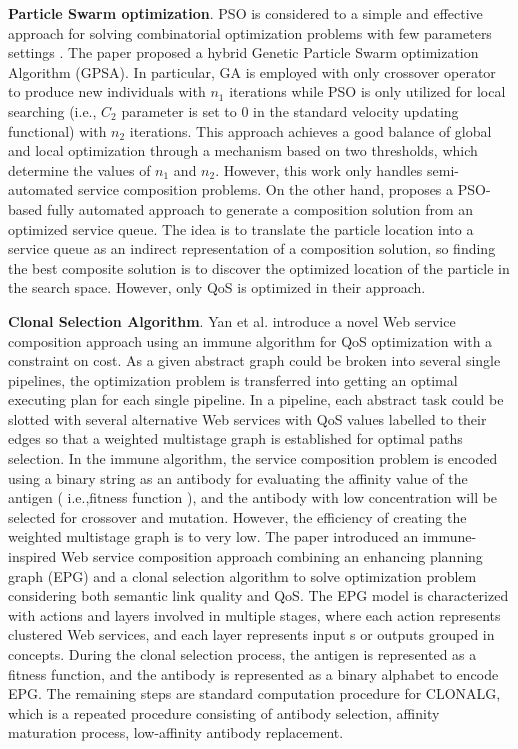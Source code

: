 \textbf{Particle Swarm optimization}.
PSO is considered to a simple and effective approach for solving combinatorial optimization problems with few parameters settings \cite{long2009environment}. The paper \cite{liu2007hybrid} proposed a hybrid Genetic Particle Swarm optimization Algorithm (GPSA). In particular, GA is employed with only crossover operator to produce new individuals with $n_1$ iterations while PSO is only utilized for local searching (i.e., $C_2$ parameter is set to 0 in the standard velocity updating functional) with $n_2$ iterations. This approach achieves a good balance of global and local optimization through a  mechanism based on two thresholds, which determine the values of $n_1$ and $n_2$. However, this work \cite{liu2007hybrid} only handles semi-automated service composition problems. On the other hand, \cite{da2016particle} proposes a PSO-based fully automated approach to generate a composition solution from an optimized service queue. The idea is to translate the particle location into a service queue as an indirect representation of a composition solution, so finding the best composite solution is to discover the optimized location of the particle in the search space. However, only QoS is optimized in their approach.

\textbf{Clonal Selection Algorithm}.
Yan et al. \cite{yan2006immune} introduce a novel Web service composition approach using an immune algorithm for QoS optimization with a constraint on cost. As a given abstract graph could be broken into several single pipelines, the optimization problem is transferred into getting an optimal executing plan for each single pipeline. In a pipeline, each abstract task could be slotted with several alternative Web services with QoS values labelled to their edges so that a weighted multistage graph is established for optimal paths selection. In the immune algorithm, the service composition problem is encoded using a binary string as an antibody for evaluating the affinity value of the antigen ( i.e.,fitness function ), and the antibody with low concentration will be selected for crossover and mutation. However, the efficiency of creating the weighted multistage graph is to very low. The paper \cite{pop2009immune} introduced an immune-inspired Web service composition approach combining an enhancing planning graph (EPG) and a clonal selection algorithm to solve optimization problem considering both semantic link quality and QoS.  The EPG model is characterized with actions and layers involved in multiple stages, where each action represents clustered Web services, and each layer represents input s or outputs grouped in concepts. During the clonal selection process, the antigen is represented as a fitness function, and the antibody is represented as a binary alphabet to encode EPG. The remaining steps are standard computation procedure for CLONALG, which is a repeated procedure consisting of antibody selection, affinity maturation process, low-affinity antibody replacement.

